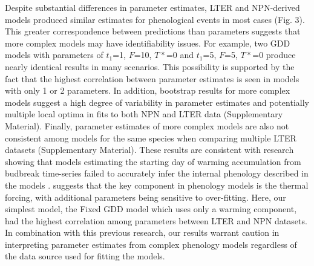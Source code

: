 \documentclass[fleqn,12pt,lineno]{wlpeerj} %
\begin{document}
Despite substantial differences in parameter estimates, LTER and NPN-derived models produced similar estimates for phenological events in most cases (Fig. 3). This greater correspondence between predictions than parameters suggests that more complex models may have identifiability issues. For example, two GDD models with parameters of $t_{1}$=1, $F$=10, $T*$=0 and $t_{1}$=5, $F$=5, $T*$=0 produce nearly identical results in many scenarios. This possibility is supported by the fact that the highest correlation between parameter estimates is seen in models with only 1 or 2 parameters. In addition, bootstrap results for more complex models suggest a high degree of variability in parameter estimates and potentially multiple local optima in fits to both NPN and LTER data (Supplementary Material). Finally, parameter estimates of more complex models are also not consistent among models for the same species when comparing multiple LTER datasets (Supplementary Material). These results are consistent with research showing that models estimating the starting day of warming accumulation from budbreak time-series failed to accurately infer the internal phenology described in the models \citep{chuine2016}. \cite{basler2016} suggests that the key component in phenology models is the thermal forcing, with additional parameters being sensitive to over-fitting. Here, our simplest model, the Fixed GDD model which uses only a warming component, had the highest correlation among parameters between LTER and NPN datasets. In combination with this previous research, our results warrant caution in interpreting parameter estimates from complex phenology models regardless of the data source used for fitting the models.
\end{document}
